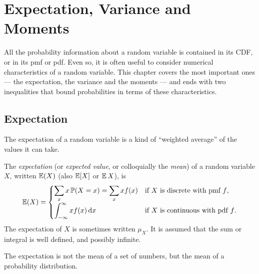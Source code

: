 \chapter{Expectation, Variance and Moments}\label{ch:expectation-moments}



All the probability information about a random variable is contained in its CDF, or in its pmf or pdf. Even so, it is often useful to consider numerical characteristics of a random variable. This chapter covers the most important ones --- the expectation, the variance and the moments --- and ends with two inequalities that bound probabilities in terms of these characteristics.

\section{Expectation}\label{sec:expectation}

The expectation of a random variable is a kind of ``weighted average'' of the values it can take.

\begin{definition}[Expectation]\label{def:expectation}
The \emph{expectation} (or \emph{expected value}, or colloquially the \emph{mean}) of a random variable $X$, written $\operatorname{\mathbb{E}}(X)$ (also $\operatorname{\mathbb{E}}[X]$ or $\operatorname{\mathbb{E}} X$), is
\[
  \operatorname{\mathbb{E}}(X) = \begin{cases}
    \displaystyle \sum_x x \, \mathbb{P}(X = x) = \sum_x x f(x) & \text{if $X$ is discrete with pmf $f$}, \\[10pt]
    \displaystyle \int_{-\infty}^{\infty} x f(x) \mathop{}\!\mathrm{d} x & \text{if $X$ is continuous with pdf $f$}.
  \end{cases}
\]
The expectation of $X$ is sometimes written $\mu_X$. It is assumed that the sum or integral is well defined, and possibly infinite.
\end{definition}

\begin{remark}
The expectation is not the mean of a set of numbers, but the mean of a probability distribution.
\end{remark}

